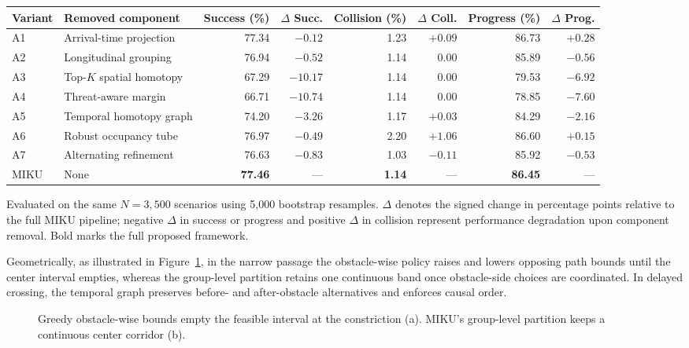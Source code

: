 \begin{table}
{
\begin{tabular}{llrrrrrr}
\toprule
Variant & Removed component & Success (\%) & $\Delta$ Succ. & Collision (\%) & $\Delta$ Coll. & Progress (\%) & $\Delta$ Prog. \\
\midrule
A1 & Arrival-time projection & 77.34 & $-0.12$ & 1.23 & $+0.09$ & 86.73 & $+0.28$ \\
A2 & Longitudinal grouping & 76.94 & $-0.52$ & 1.14 & $0.00$ & 85.89 & $-0.56$ \\
A3 & Top-$K$ spatial homotopy & 67.29 & $-10.17$ & 1.14 & $0.00$ & 79.53 & $-6.92$ \\
A4 & Threat-aware margin & 66.71 & $-10.74$ & 1.14 & $0.00$ & 78.85 & $-7.60$ \\
A5 & Temporal homotopy graph & 74.20 & $-3.26$ & 1.17 & $+0.03$ & 84.29 & $-2.16$ \\
A6 & Robust occupancy tube & 76.97 & $-0.49$ & 2.20 & $+1.06$ & 86.60 & $+0.15$ \\
A7 & Alternating refinement & 76.63 & $-0.83$ & 1.03 & $-0.11$ & 85.92 & $-0.53$ \\
MIKU & None & \textbf{77.46} & --- & \textbf{1.14} & --- & \textbf{86.45} & --- \\
\bottomrule
\end{tabular}}
\begin{tabnote}[Notes]
Evaluated on the same $N=3,500$ scenarios using 5,000 bootstrap resamples. $\Delta$ denotes the signed change in percentage points relative to the full MIKU pipeline; negative $\Delta$ in success or progress and positive $\Delta$ in collision represent performance degradation upon component removal. Bold marks the full proposed framework.
\end{tabnote}
\label{tab:ablation_results}
\end{table}

Geometrically, as illustrated in Figure~\ref{fig:narrow_mechanism_en}, in the narrow passage the obstacle-wise policy raises and lowers opposing path bounds until the center interval empties, whereas the group-level partition retains one continuous band once obstacle-side choices are coordinated. In delayed crossing, the temporal graph preserves before- and after-obstacle alternatives and enforces causal order.

\begin{figure}
\centering
{}
\caption{Greedy obstacle-wise bounds empty the feasible interval at the constriction (a). MIKU's group-level partition keeps a continuous center corridor (b).}
\label{fig:narrow_mechanism_en}
\end{figure}

